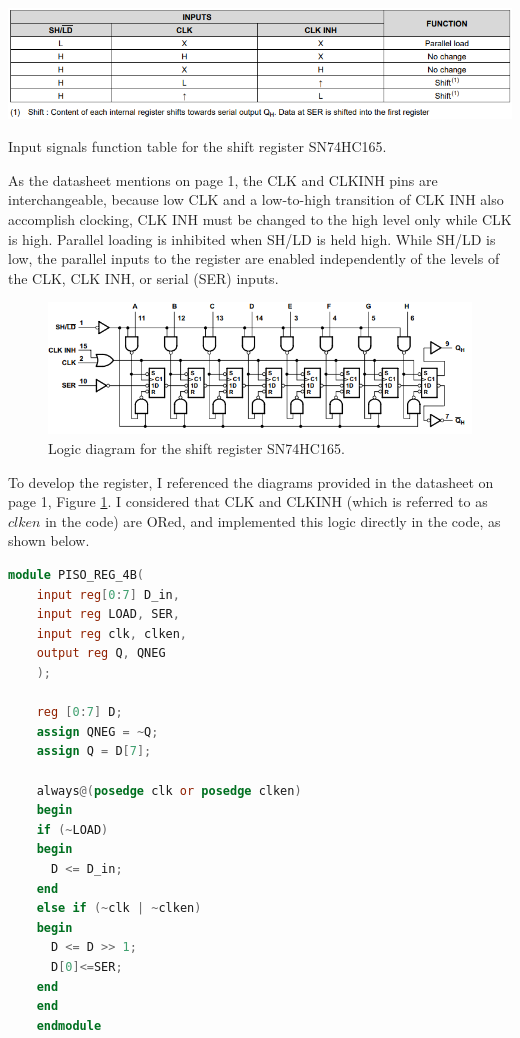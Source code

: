 \documentclass[9pt,technote]{IEEEtran}
\begin{document}
	\begin{table}[H]
		\centering
		\includegraphics[width=\columnwidth]{"Function table"}
		\caption{Input signals function table for the shift register SN74HC165.}
		\label{table:function-table}
	\end{table}
	
	As the datasheet mentions on page 1, the CLK and CLKINH pins are interchangeable, because low CLK and a low-to-high transition of CLK INH also accomplish clocking, CLK INH must be changed to the high level only while CLK is high. Parallel loading is inhibited when SH/LD is held high. While SH/LD is low, the parallel inputs to the register are enabled independently of the levels of the CLK, CLK INH, or serial (SER) inputs.\cite{texas_instruments_sn74hc165}
	
	\begin{figure}[H]
		\centering
		\includegraphics[width=0.9\columnwidth]{"Logic diagram"}
		\caption{Logic diagram for the shift register SN74HC165.}
		\label{fig:logic-diagram}
	\end{figure}
	
	To develop the register, I referenced the diagrams provided in the datasheet on page 1, Figure \ref{fig:logic-diagram}. I considered that CLK and CLKINH (which is referred to as $clken$ in the code) are ORed, and implemented this logic directly in the code, as shown below.
	
	\begin{lstlisting}[language=Verilog, caption={Verilog code for an 8 bit shift register.}, label={code:audio_correlation}]
	module PISO_REG_4B(
	input reg[0:7] D_in,
	input reg LOAD, SER,
	input reg clk, clken,
	output reg Q, QNEG
	);
	
	reg [0:7] D;
	assign QNEG = ~Q;
	assign Q = D[7];
	
	always@(posedge clk or posedge clken)
	begin
	if (~LOAD)
	begin
	  D <= D_in;
	end 
	else if (~clk | ~clken)
	begin
	  D <= D >> 1;
	  D[0]<=SER;
	end
	end
	endmodule
	\end{lstlisting}
	
\end{document}
